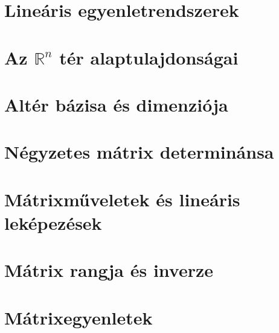 \documentclass[12pt]{article}
\begin{document}
	\section{Lineáris egyenletrendszerek}
	
	\section{Az \(\mathbb{R}^n\) tér alaptulajdonságai}
	
	\section{Altér bázisa és dimenziója}
	
	\section{Négyzetes mátrix determinánsa}
	
	\section{Mátrixműveletek és lineáris leképezések}
	
	\section{Mátrix rangja és inverze}
	
	\section{Mátrixegyenletek}
	
\end{document}
